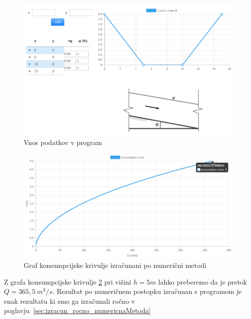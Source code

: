 \begin{figure}[H]
	\begin{centering}
		\includegraphics[width=\textwidth]{slike/izracuni/numericno_modeliranjeStruge.png}		
		\caption{Vnos podatkov v program}\label{fig:modeliranjeStruge}
	\end{centering}
\end{figure}

\begin{figure}[H]
	\begin{centering}
		\includegraphics[width=\textwidth]{slike/izracuni/numericno_konsumpcijskaKrivulja.png}		
		\caption{Graf konsumpcijske krivulje izračunani po numerični metodi}\label{fig:custom_konsumpcijskaKrivulja}
	\end{centering}
\end{figure}


Z grafa konsumpcijske krivulje \ref{fig:custom_konsumpcijskaKrivulja} pri višini $h = 5m$ lahko preberemo da je pretok $Q=365,5~m^3/s$. Rezultat po numeričnem postopku izračunan s programom je enak rezultatu ki smo ga izračunali ročno v poglavju~\ref{sec:izracun_rocno_numericnaMetoda}




